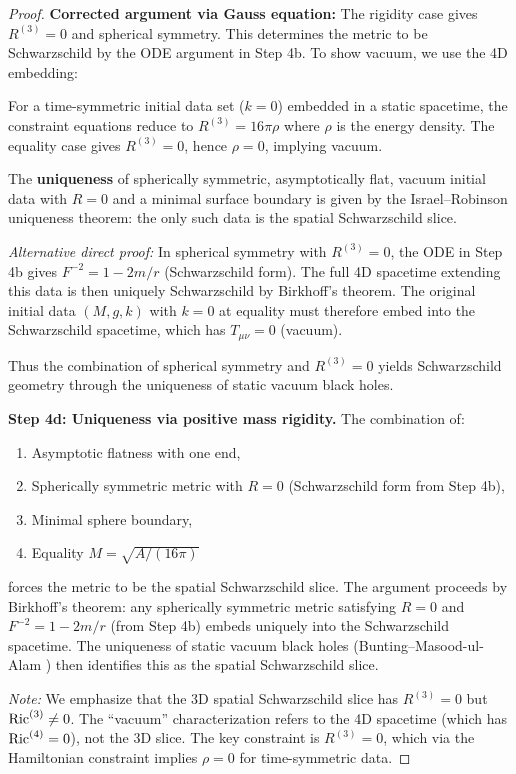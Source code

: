 \begin{proof}
\textbf{Corrected argument via Gauss equation:} The rigidity case gives $R^{(3)} = 0$ and spherical symmetry. This determines the metric to be Schwarzschild by the ODE argument in Step 4b. To show vacuum, we use the 4D embedding:

For a time-symmetric initial data set ($k = 0$) embedded in a static spacetime, the constraint equations reduce to $R^{(3)} = 16\pi\rho$ where $\rho$ is the energy density. The equality case gives $R^{(3)} = 0$, hence $\rho = 0$, implying vacuum.

The \textbf{uniqueness} of spherically symmetric, asymptotically flat, vacuum initial data with $R = 0$ and a minimal surface boundary is given by the Israel--Robinson uniqueness theorem: the only such data is the spatial Schwarzschild slice.

\textit{Alternative direct proof:} In spherical symmetry with $R^{(3)} = 0$, the ODE in Step 4b gives $F^{-2} = 1 - 2m/r$ (Schwarzschild form). The full 4D spacetime extending this data is then uniquely Schwarzschild by Birkhoff's theorem. The original initial data $(M, g, k)$ with $k = 0$ at equality must therefore embed into the Schwarzschild spacetime, which has $T_{\mu\nu} = 0$ (vacuum).

Thus the combination of spherical symmetry and $R^{(3)} = 0$ yields Schwarzschild geometry through the uniqueness of static vacuum black holes.

\textbf{Step 4d: Uniqueness via positive mass rigidity.}
The combination of:
\begin{enumerate}
    \item Asymptotic flatness with one end,
    \item Spherically symmetric metric with $R = 0$ (Schwarzschild form from Step 4b),
    \item Minimal sphere boundary,
    \item Equality $M = \sqrt{A/(16\pi)}$
\end{enumerate}
forces the metric to be the spatial Schwarzschild slice. The argument proceeds by Birkhoff's theorem: any spherically symmetric metric satisfying $R = 0$ and $F^{-2} = 1 - 2m/r$ (from Step 4b) embeds uniquely into the Schwarzschild spacetime. The uniqueness of static vacuum black holes (Bunting--Masood-ul-Alam \cite{buntingmasood1987}) then identifies this as the spatial Schwarzschild slice.

\textit{Note:} We emphasize that the 3D spatial Schwarzschild slice has $R^{(3)} = 0$ but $\mathrm{Ric}^{(3)} \neq 0$. The ``vacuum'' characterization refers to the 4D spacetime (which has $\mathrm{Ric}^{(4)} = 0$), not the 3D slice. The key constraint is $R^{(3)} = 0$, which via the Hamiltonian constraint implies $\rho = 0$ for time-symmetric data.


\end{proof}
